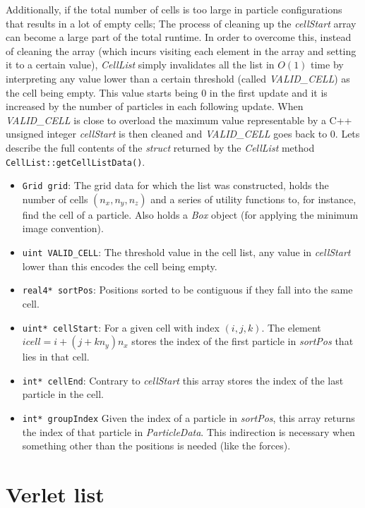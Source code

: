 \documentclass[ twoside,openright,titlepage,numbers=noenddot,%
headinclude,footinclude,cleardoublepage=empty,abstract=on,
BCOR=5mm,paper=a4,fontsize=11pt, dvipsnames
]{scrreprt}
\def\ucpp{uammd_cpp_lexer.py:UAMMDCppLexer -x}
\begin{document}
Additionally, if the total number of cells is too large in particle configurations that results in a lot of empty cells; The process of cleaning up the \emph{cellStart} array can become a large part of the total runtime. In order to overcome this, instead of cleaning the array (which incurs visiting each element in the array and setting it to a certain value), \emph{CellList} simply invalidates all the list in $O(1)$ time by interpreting any value lower than a certain threshold (called \emph{VALID\_CELL}) as the cell being empty.
This value starts being $0$ in the first update and it is increased by the number of particles in each following update. When \emph{VALID\_CELL} is close to overload the maximum value representable by a C++ unsigned integer \emph{cellStart} is then cleaned and \emph{VALID\_CELL} goes back to $0$.
Lets describe the full contents of the \emph{struct} returned by the \emph{CellList} method \texttt{CellList::getCellListData()}.
\begin{itemize}
\item\texttt{Grid grid}:
  The grid data for which the list was constructed, holds the number of cells $(n_x, n_y, n_z)$ and a series of utility functions to, for instance, find the cell of a particle. Also holds a \emph{Box} object (for applying the minimum image convention).
\item\texttt{uint VALID_CELL}:
  The threshold value in the cell list, any value in \emph{cellStart} lower than this encodes the cell being empty. 
\item\texttt{real4* sortPos}:
  Positions sorted to be contiguous if they fall into the same cell. 
\item\texttt{uint* cellStart}:
  For a given cell with index $(i,j,k)$. The element $icell = i + (j + kn_y)n_x$ stores the index of the first particle in \emph{sortPos} that lies in that cell.
\item\texttt{int* cellEnd}:
  Contrary to \emph{cellStart} this array stores the index of the last particle in the cell.
\item\texttt{int* groupIndex}
  Given the index of a particle in \emph{sortPos}, this array returns the index of that particle in \emph{ParticleData}.
  This indirection is necessary when something other than the positions is needed (like the forces).
\end{itemize}


\section{Verlet list}\label{sec:verletlist}
\end{document}
